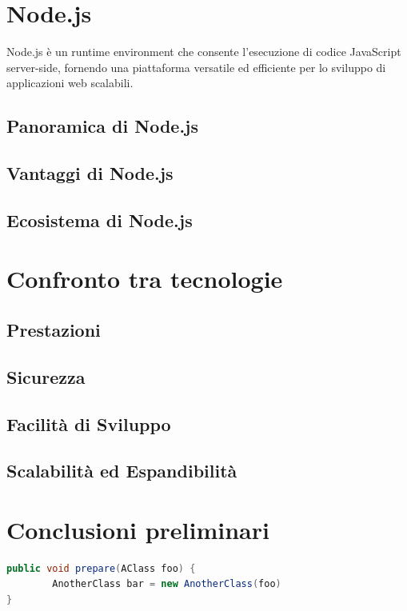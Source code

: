 \newpage


\newpage
\section{Node.js}
Node.js è un runtime environment che consente l'esecuzione di codice JavaScript server-side, fornendo una piattaforma versatile ed efficiente per lo sviluppo di applicazioni web scalabili.
\label{sec:Node}
\subsection{Panoramica di Node.js}
\subsection{Vantaggi di Node.js}
\subsection{Ecosistema di Node.js}

\newpage
\section{Confronto tra tecnologie}
\label{sec:Confronto}
\subsection{Prestazioni}
\subsection{Sicurezza}
\subsection{Facilità di Sviluppo}
\subsection{Scalabilità ed Espandibilità}

\newpage
\section{Conclusioni preliminari}
\label{sec:ConclusioniTecnologie}

\newpage


\begin{lstlisting}[language=Java, label=lst:java, caption={Some code in another language than the default one}]
public void prepare(AClass foo) {
        AnotherClass bar = new AnotherClass(foo)
}
\end{lstlisting}
